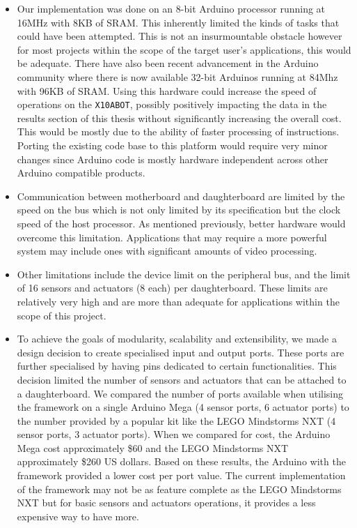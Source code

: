 \begin{itemize}
\item Our implementation was done on an 8-bit Arduino processor running at 16MHz with 8KB of SRAM. This inherently limited the kinds of tasks that could have been attempted. This is not an insurmountable obstacle however for most projects within the scope of the target user's applications, this would be adequate. There have also been recent advancement in the Arduino community where there is now available 32-bit Arduinos running at 84Mhz with 96KB of SRAM. Using this hardware could increase the speed of operations on the \texttt{X10ABOT}, possibly positively impacting the data in the results section of this thesis without significantly increasing the overall cost. This would be mostly due to the ability of faster processing of instructions. Porting the existing code base to this platform would require very minor changes since Arduino code is mostly hardware independent across other Arduino compatible products.

\item Communication between motherboard and daughterboard are limited by the speed on the \iic bus which is not only limited by its specification but the clock speed of the host processor. As mentioned previously, better hardware would overcome this limitation. Applications that may require a more powerful system may include ones with significant amounts of video processing.
\item Other limitations include the  device limit on the peripheral bus, and the limit of 16 sensors and actuators (8 each) per daughterboard. These limits are relatively very high and are more than adequate for applications within the scope of this project.
\item To achieve the goals of modularity, scalability and extensibility, we made a design decision to create specialised input and output ports. These ports are further specialised by having pins dedicated to certain functionalities. This decision limited the number of sensors and actuators that can be attached to a daughterboard. We compared the number of ports available when utilising the \xten framework on a single Arduino Mega (4 sensor ports, 6 actuator ports) to the number provided by a popular kit like the LEGO Mindstorms NXT (4 sensor ports, 3 actuator ports). When we compared for cost, the Arduino Mega cost approximately \$60 and the LEGO Mindstorms NXT approximately \$260 US dollars. Based on these results, the Arduino with the \xten framework provided a lower cost per port value. The current implementation of the \xten framework may not be as feature complete as the LEGO Mindstorms NXT but for basic sensors and actuators operations, it provides a less expensive way to have more.
\end{itemize}

